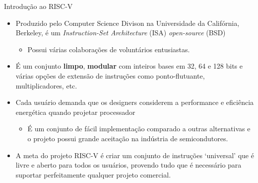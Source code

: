 \documentclass[aspectratio=169]{beamer}
\begin{document}
\begin{frame}{Introdução ao RISC-V}
	\begin{itemize}
		\item Produzido pelo Computer Science Divison na Universidade da Califórnia, Berkeley, é um \textit{Instruction-Set Architecture} (ISA) \textit{open-source} (BSD)
		\begin{itemize}
			\item Possui várias colaborações de voluntários entusiastas.
		\end{itemize}

		\item É um conjunto \textbf{limpo}, \textbf{modular} com inteiros bases em 32, 64 e 128 bits e várias opções de extensão de instruções como ponto-flutuante, multiplicadores, etc.

		\item Cada usuário demanda que os designers considerem a performance e eficiência energética quando projetar processador
		\begin{itemize}
			\item É um conjunto de fácil implementação comparado a outras alternativas e o projeto possui grande aceitação na indústria de semicondutores.
		\end{itemize}

		\item A meta do projeto RISC-V é criar um conjunto de instruções `universal' que é livre e aberto para todos os usuários, provendo tudo que é necessário para suportar perfeitamente qualquer projeto comercial.
	\end{itemize}
\end{frame}
\end{document}
